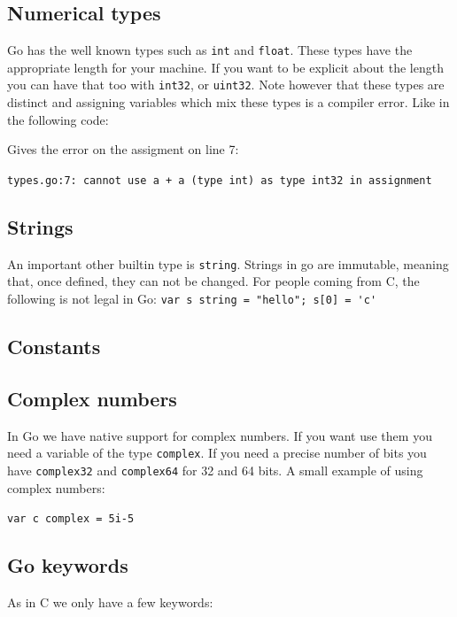 \subsection{Numerical types}

Go has the well known types such as \lstinline{int} and
\lstinline{float}. These types have the appropriate length for your
machine. If you want to be explicit about the length you can have
that too with \lstinline{int32}, or \lstinline{uint32}. Note however
that these types are distinct and assigning variables which mix
these types is a compiler error. Like in the following code:


Gives the error on the assigment on line 7:

\noindent\lstinline{types.go:7: cannot use a + a (type int) as type int32 in assignment}

\subsection{Strings}

An important other builtin type is \lstinline{string}. Strings in go are
immutable, meaning that, once defined, they can not be changed. For
people coming from C, the following is not legal in Go:
\lstinline{var s string = "hello"; s[0] = 'c'} 

\subsection{Constants}

\subsection{Complex numbers}
In Go we have native support for complex numbers. If you 
want use them you need a variable of the type \lstinline{complex}. If
you need a precise number of bits you have \lstinline{complex32} and
\lstinline{complex64} for 32 and 64 bits. A small example of using complex numbers:

\lstinline{var c complex = 5i-5}

\subsection{Go keywords}
As in C we only have a few keywords:

